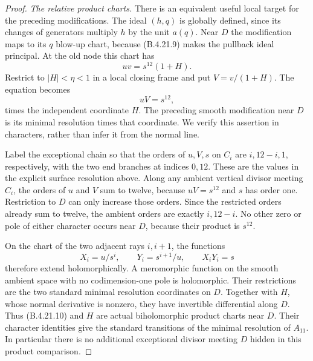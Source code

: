 \begin{proof}
\emph{The relative product charts.}
There is an equivalent useful local target for the preceding
modifications.  The ideal $(h,q)$ is globally defined, since
its changes of generators multiply $h$ by the unit $a(q)$.
Near $D$ the modification maps to its $q$ blow-up chart,
because (B.4.21.9) makes the pullback ideal principal.
At the old node this chart has
\[
 uv=s^{12}(1+H).
\]
Restrict to $|H|<\eta<1$ in a local closing frame and put
$V=v/(1+H)$.  The equation becomes
\[
 uV=s^{12},
\]
times the independent coordinate $H$.
The preceding smooth modification near $D$ is its minimal
resolution times that coordinate.  We verify this assertion
in characters, rather than infer it from the normal line.

Label the exceptional chain so that the orders of $u,V,s$
on $C_i$ are $i,12-i,1$, respectively, with the two end
branches at indices $0,12$.  These are the values in the
explicit surface resolution above.  Along any ambient vertical
divisor meeting $C_i$, the orders of $u$ and $V$ sum to twelve,
because $uV=s^{12}$ and $s$ has order one.  Restriction to
$D$ can only increase those orders.  Since the restricted
orders already sum to twelve, the ambient orders are exactly
$i,12-i$.  No other zero or pole of either character occurs
near $D$, because their product is $s^{12}$.

On the chart of the two adjacent rays $i,i+1$, the functions
\[
 X_i=u/s^i,\qquad Y_i=s^{i+1}/u,
 \qquad X_iY_i=s
 \tag{B.4.21.10}
\]
therefore extend holomorphically.  A meromorphic function on
the smooth ambient space with no codimension-one pole is
holomorphic.  Their restrictions are the two standard minimal
resolution coordinates on $D$.  Together with $H$, whose
normal derivative is nonzero, they have invertible differential
along $D$.  Thus (B.4.21.10) and $H$ are actual biholomorphic
product charts near $D$.  Their character identities give the
standard transitions of the minimal resolution of $A_{11}$.
In particular there is no additional exceptional divisor
meeting $D$ hidden in this product comparison.


\end{proof}
